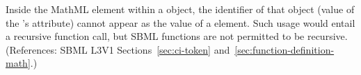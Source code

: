 Inside the  MathML element within a \FunctionDefinition
object, the identifier of that object (\ie value of the
\FunctionDefinition's  attribute) cannot appear as the value of a
 element.  Such usage would entail a recursive function call, but
SBML functions are not permitted to be recursive.  (References: SBML L3V1
Sections~\ref{sec:ci-token} and~\ref{sec:function-definition-math}.)
